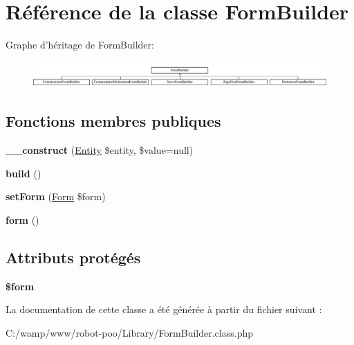 \hypertarget{class_library_1_1_form_builder}{\section{Référence de la classe Form\+Builder}
\label{class_library_1_1_form_builder}
}
Graphe d'héritage de Form\+Builder\+:\begin{figure}[H]
\begin{center}
\leavevmode
\includegraphics[height=0.991150cm]{class_library_1_1_form_builder}
\end{center}
\end{figure}
\subsection*{Fonctions membres publiques}
\begin{DoxyCompactItemize}
\item 
\hypertarget{class_library_1_1_form_builder_a8d1b8ac2541165e4ec6cab4c2010ad9b}{{\bfseries \+\_\+\+\_\+construct} (\hyperlink{class_library_1_1_entity}{Entity} \$entity, \$value=null)}\label{class_library_1_1_form_builder_a8d1b8ac2541165e4ec6cab4c2010ad9b}

\item 
\hypertarget{class_library_1_1_form_builder_a3928875ef0ceb18a51c1061be3eb3a00}{{\bfseries build} ()}\label{class_library_1_1_form_builder_a3928875ef0ceb18a51c1061be3eb3a00}

\item 
\hypertarget{class_library_1_1_form_builder_ad71a2b86c35b34dfc234b26656b4d90a}{{\bfseries set\+Form} (\hyperlink{class_library_1_1_form}{Form} \$form)}\label{class_library_1_1_form_builder_ad71a2b86c35b34dfc234b26656b4d90a}

\item 
\hypertarget{class_library_1_1_form_builder_a4d5123cf815fd723d6dfdcb2c16fcc42}{{\bfseries form} ()}\label{class_library_1_1_form_builder_a4d5123cf815fd723d6dfdcb2c16fcc42}

\end{DoxyCompactItemize}
\subsection*{Attributs protégés}
\begin{DoxyCompactItemize}
\item 
\hypertarget{class_library_1_1_form_builder_a1a4fda4c28a9ee5f91102c023b9501f4}{{\bfseries \$form}}\label{class_library_1_1_form_builder_a1a4fda4c28a9ee5f91102c023b9501f4}

\end{DoxyCompactItemize}


La documentation de cette classe a été générée à partir du fichier suivant \+:\begin{DoxyCompactItemize}
\item 
C\+:/wamp/www/robot-\/poo/\+Library/Form\+Builder.\+class.\+php\end{DoxyCompactItemize}
